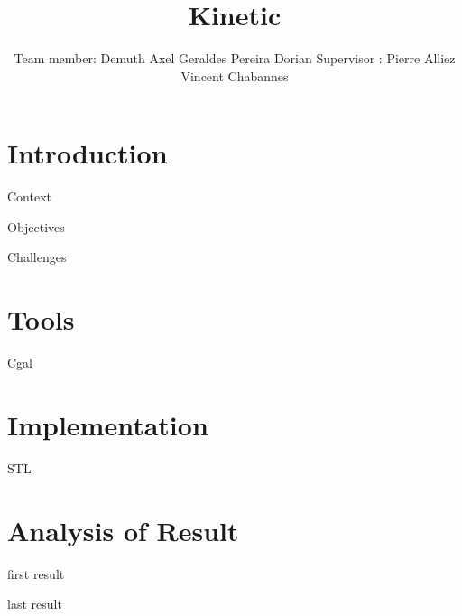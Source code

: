 \documentclass[10pt]{beamer}
\title{Kinetic}
\author[Demuth Axel, Geraldes Pereira Dorian]{Team member: \newline\newline Demuth Axel \newline Geraldes Pereira Dorian \newline\newline Supervisor :  \newline\newline Pierre Alliez \newline Vincent Chabannes}
\date{}
\begin{document}
\frame{\titlepage}
\begin{frame}
    \tableofcontents
\end{frame}
\section{Introduction}

\begin{frame}{Context}
\end{frame}
\begin{frame}{Objectives}

\end{frame}
\begin{frame}{Challenges}

\end{frame}

\section{Tools}
\begin{frame}{Cgal}

\end{frame}
\section{Implementation}
\begin{frame}{STL}

\end{frame}
\section{Analysis of Result}
\begin{frame}{first result}

\end{frame}
\begin{frame}{last result}

\end{frame}
\end{document}
